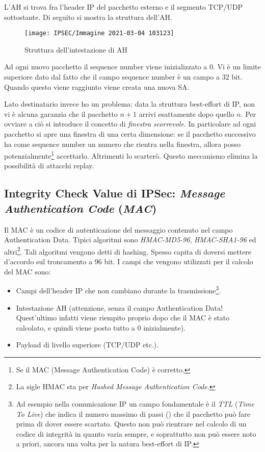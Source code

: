 \documentclass[14pt]{extreport}
\begin{document}
L'AH si trova fra l'header IP del pacchetto esterno e il segmento TCP/UDP sottostante.
Di seguito si mostra la struttura dell'AH.
\begin{figure}[H]
    \centering
    \texttt{[image: IPSEC/Immagine 2021-03-04 103123]}
    \caption{Struttura dell'intestazione di AH}
    \label{IPSEC8}
\end{figure}

Ad ogni nuovo pacchetto il sequence number viene inizializzato a 0. Vi è un limite superiore dato dal fatto che il campo sequence number è un campo a 32 bit. Quando questo viene raggiunto viene creata una nuova SA.

Lato destinatario invece ho un problema: data la struttura best-effort di IP, non vi è alcuna garanzia che il pacchetto $n+1$ arrivi esattamente dopo quello $n$. Per ovviare a ciò si introduce il concetto di \textit{finestra scorrevole}. In particolare ad ogni pacchetto si apre una finestra di una certa dimensione: se il pacchetto successivo ha come sequence number un numero che rientra nella finestra, allora posso potenzialmente\footnote{Se il MAC (Message Authentication Code) è corretto.} accettarlo. Altrimenti lo scarterò. Questo meccanismo elimina la possibilità di attacchi replay.





\subsection{Integrity Check Value di IPSec: \textit{Message Authentication Code} (\textit{MAC})}

Il MAC è un codice di autenticazione del messaggio contenuto nel campo Authentication Data. Tipici algoritmi sono \textit{HMAC-MD5-96}, \textit{HMAC-SHA1-96} ed altri\footnote{La sigle HMAC sta per \textit{Hashed Message Authentication Code}.}. Tali algoritmi vengono detti di hashing. Spesso capita di doversi mettere d'accordo sul troncamento a 96 bit.
I campi che vengono utilizzati per il calcolo del MAC sono:


\begin{itemize}
    \item Campi dell'header IP che non cambiano durante la trasmissione\footnote{Ad esempio nella comunicazione IP un campo fondamentale è il \textit{TTL} (\textit{Time To Live}) che indica il numero massimo di passi () che il pacchetto può fare prima di dover essere scartato. Questo non può rientrare nel calcolo di un codice di integrità in quanto varia sempre, e soprattutto non può essere noto a priori, ancora una volta per la natura best-effort di IP.}.
    
    \item Intestazione AH (attenzione, senza il campo Authentication Data! Quest'ultimo infatti viene riempito proprio dopo che il MAC è stato calcolato, e quindi viene posto tutto a 0 inizialmente).
    
    \item Payload di livello superiore (TCP/UDP etc.).
\end{itemize}
\end{document}
